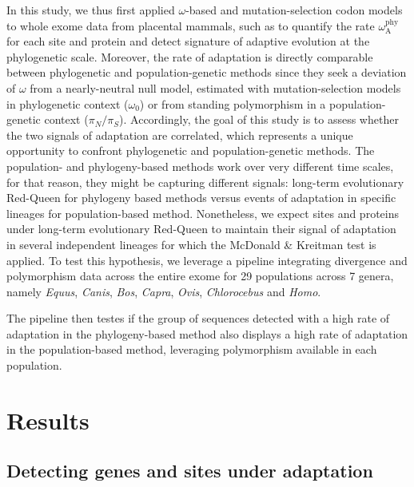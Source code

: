 \documentclass{article}
\newcommand{\rateApop}{\omega_{\mathrm{A}}}
\newcommand{\rateAphy}{\rateApop^{\mathrm{phy}}}
\newcommand{\pn}{\pi_N}
\newcommand{\ps}{\pi_S}
\newcommand{\pnps}{\pn / \ps}
\begin{document}
    In this study, we thus first applied $\omega$-based and mutation-selection codon models to whole exome data from placental mammals, such as to quantify the rate $\rateAphy$ for each site and protein and detect signature of adaptive evolution at the phylogenetic scale.
    Moreover, the rate of adaptation is directly comparable between phylogenetic and population-genetic methods since they seek a deviation of $\omega$ from a nearly-neutral null model, estimated with mutation-selection models in phylogenetic context ($\omega_{0}$) or from standing polymorphism in a population-genetic context ($\pnps$).
    Accordingly, the goal of this study is to assess whether the two signals of adaptation are correlated, which represents a unique opportunity to confront phylogenetic and population-genetic methods.
    The population- and phylogeny-based methods work over very different time scales, for that reason, they might be capturing different signals: long-term evolutionary Red-Queen for phylogeny based methods versus events of adaptation in specific lineages for population-based method.
    Nonetheless, we expect sites and proteins under long-term evolutionary Red-Queen to maintain their signal of adaptation in several independent lineages for which the McDonald \& Kreitman test is applied.
    To test this hypothesis, we leverage a pipeline integrating divergence and polymorphism data across the entire exome for 29 populations across 7 genera, namely \textit{Equus}, \textit{Canis}, \textit{Bos}, \textit{Capra}, \textit{Ovis}, \textit{Chlorocebus} and \textit{Homo}.

    The pipeline then testes if the group of sequences detected with a high rate of adaptation in the phylogeny-based method also displays a high rate of adaptation in the population-based method, leveraging polymorphism available in each population.

    \section*{Results}\label{sec:results}

    \subsection*{Detecting genes and sites under adaptation}
\end{document}
